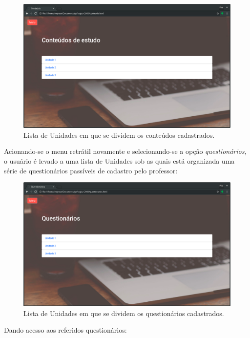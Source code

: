 \documentclass[11pt, a4paper]{article}
\begin{document}
				\begin{figure}[!h]
					\centering
					\includegraphics[scale=.32]{print7.png}
					\caption{Lista de Unidades em que se dividem os conteúdos cadastrados.}
				\end{figure}

			Acionando-se o menu retrátil novamente e selecionando-se a opção \emph{questionários}, o usuário é levado a uma lista de Unidades sob as quais está organizada uma série de questionários passíveis de cadastro pelo professor:

				\begin{figure}[!h]
					\centering
					\includegraphics[scale=.32]{print8.png}
					\caption{Lista de Unidades em que se dividem os questionários cadastrados.}
				\end{figure}

			Dando acesso aos referidos questionários:
\end{document}

